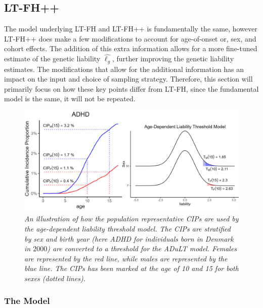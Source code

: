 \subsection{LT-FH++}

The model underlying LT-FH and LT-FH++ is fundamentally the same, however LT-FH++ does make a few modifications to account for age-of-onset or, sex, and cohort effects. The addition of this extra information allows for a more fine-tuned estimate of the genetic liability $ \hat{\ell_g} $, further improving the genetic liability estimates. The modifications that allow for the additional information has an impact on the input and choice of sampling strategy. Therefore, this section will primarily focus on how these key points differ from LT-FH, since the fundamental model is the same, it will not be repeated. 


\begin{figure}[h]
	\includegraphics[width=\textwidth]{methods/adult_top.png}
	\caption[Age-dependent liability threshold model and its relationship to the CIPs]{
		\sl An illustration of how the population representative CIPs are used by the age-dependent liability threshold model. The CIPs are stratified by sex and birth year (here ADHD for individuals born in Denmark in $ 2000 $) are converted to a threshold for the ADuLT model. Females are represented by the red line, while males are represented by the blue line. The CIPs has been marked at the age of 10 and 15 for both sexes (dotted lines).}
	\label{fig:adult_connection_to_CIPs}
\end{figure}

\subsubsection{The Model}

